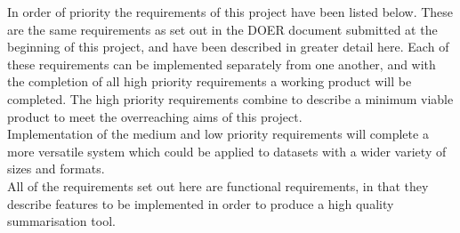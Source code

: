 In order of priority the requirements of this project have been listed below. These are the same requirements as set out in the DOER document submitted at the beginning of this project, and have been described in greater detail here. Each of these requirements can be implemented separately from one another, and with the completion of all high priority requirements a working product will be completed. The high priority requirements combine to describe a minimum viable product to meet the overreaching aims of this project. \\
Implementation of the medium and low priority requirements will complete a more versatile system which could be applied to datasets with a wider variety of sizes and formats.\\
All of the requirements set out here are functional requirements, in that they describe features to be implemented in order to produce a high quality summarisation tool.

